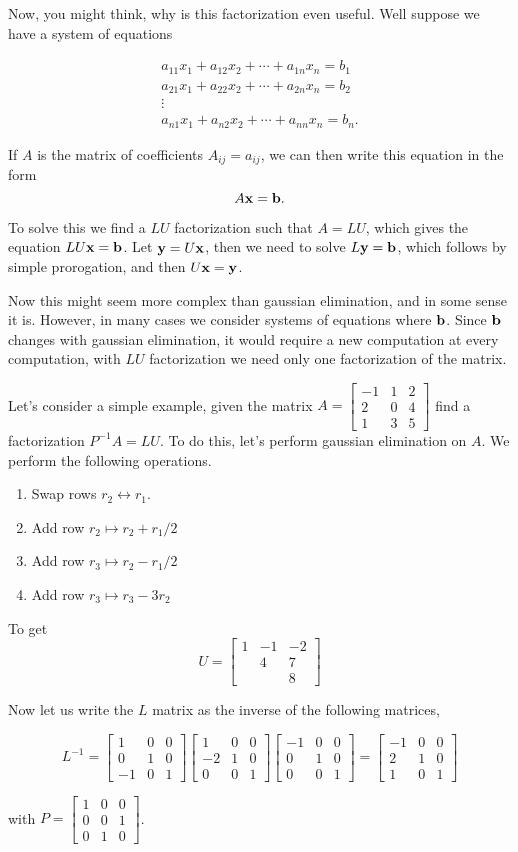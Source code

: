 \documentclass[12pt]{extarticle}
\renewcommand{\mapsto}[0]{\longmapsto}
\newcommand{\m}[1]{\begin{bmatrix} #1 \end{bmatrix}}
\begin{document}
Now, you might think, why is this factorization even useful. Well suppose we have a system of equations 


\begin{gather*}
  a_{11} x_1 + a_{12} x_2 + \cdots + a_{1n}x_n = b_1 \\
  a_{21} x_1 + a_{22} x_2 + \cdots + a_{2n}x_n = b_2 \\
  \vdots \\
  a_{n1} x_1 + a_{n2} x_2 + \cdots + a_{nn}x_n = b_n .
\end{gather*}

If $A$ is the matrix of coefficients $A_{ij} = a_{ij}$, we can then write this equation in the form 
\[
  A\vb{x} = \vb{b}.
\]

To solve this we find a $LU$ factorization such that $A = LU$, which gives the equation $LU\vb{x} = \vb{b}$. Let $\vb{y} = U\vb{x}$, then we need to solve $L\vb{y} = \vb{b}$, which follows by simple prorogation, and then $U\vb{x} = \vb{y}$. 

Now this might seem more complex than gaussian elimination, and in some sense it is. However, in many cases we consider systems of equations where $\vb{b}$. Since $\vb{b}$ changes with gaussian elimination, it would require a new computation at every computation, with $LU$ factorization we need only one factorization of the matrix. 

Let's consider a simple example, given the matrix $A = \m{ -1 & 1 & 2 \\ 2 & 0 & 4 \\ 1 & 3 & 5}$ find a factorization $P^{-1}A = LU$. To do this, let's perform gaussian elimination on $A$.  We perform the following operations.

\begin{enumerate}
  \item Swap rows $r_2 \leftrightarrow r_1$.
  \item Add row $r_2 \mapsto r_2 + r_1 / 2$
  \item Add row $r_3 \mapsto r_2 - r_1 / 2$
  \item Add row $r_3 \mapsto r_3 - 3r_2$
\end{enumerate}

To get 
\[
  U = \m{ 1 & -1 & -2 \\
            & 4  &  7 \\
            &    &  8}
\]

Now let us write the $L$ matrix as the inverse of the following matrices, 

\[
  L^{-1} = 
  \m{ 1 & 0 & 0 \\
      0 & 1 & 0  \\
      -1 & 0 & 1 }
  \m{ 1 & 0 & 0 \\
     -2 & 1 & 0  \\
      0 & 0 & 1 }
  \m{ -1 & 0 & 0 \\
      0 & 1 & 0 \\
      0 & 0 & 1 }
  =
  \m{ -1 & 0 & 0 \\
      2  & 1 & 0 \\
      1  & 0 & 1 }
\]

with $P = \m{ 1 & 0 & 0 \\ 0 & 0 & 1 \\ 0 & 1 & 0 }$.
\end{document}
